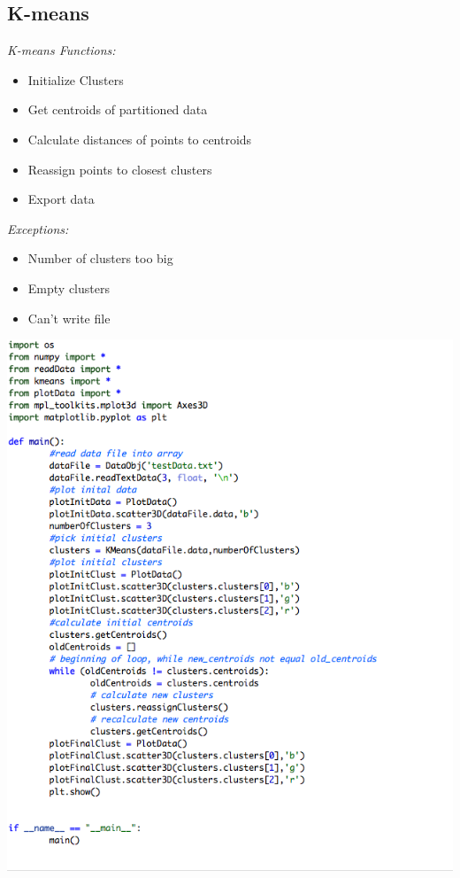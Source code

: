 \documentclass[12pt]{article} %
\begin{document}
\subsection{K-means}
\emph{K-means Functions:}
\begin{itemize}
	\item Initialize Clusters
	\item Get centroids of partitioned data 
	\item Calculate distances of points to centroids 
	\item Reassign points to closest clusters 
	\item Export data 
\end{itemize}
\emph{Exceptions:}
\begin{itemize}
	\item Number of clusters too big 
	\item Empty clusters 
	\item Can't write file 
\end{itemize}


\begin{center}
\includegraphics[width=\textwidth]{claudia2.png}
\end{center}
\end{document}
